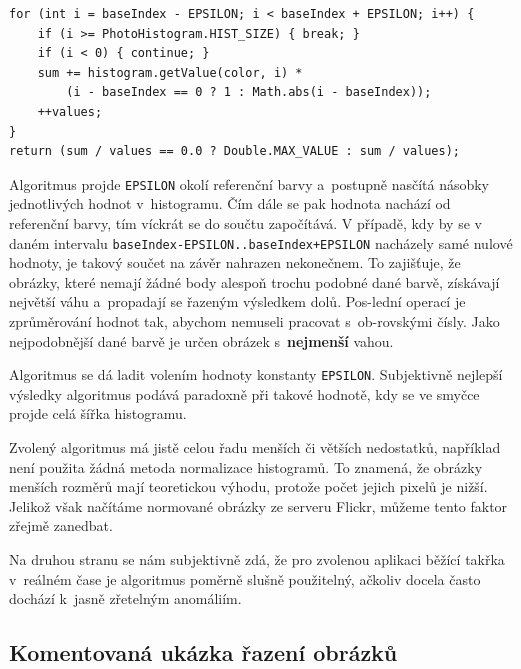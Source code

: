 \documentclass[12pt,oneside,a4paper]{article}
\newenvironment{listing}
{\begin{list}{}{\setlength{\leftmargin}{1em}}\item\scriptsize\bfseries}
{\end{list}}
\begin{document}
\begin{listing}
\begin{verbatim}
for (int i = baseIndex - EPSILON; i < baseIndex + EPSILON; i++) {
    if (i >= PhotoHistogram.HIST_SIZE) { break; }
    if (i < 0) { continue; }
    sum += histogram.getValue(color, i) *
        (i - baseIndex == 0 ? 1 : Math.abs(i - baseIndex));
    ++values;
}
return (sum / values == 0.0 ? Double.MAX_VALUE : sum / values);
\end{verbatim}
\end{listing}

Algoritmus projde \texttt{EPSILON} okolí referenční barvy a~postupně nasčítá násobky jednotlivých hodnot v~histogramu. Čím dále se pak hodnota nachází od referenční barvy, tím víckrát se do součtu započítává. V případě, kdy by se v daném intervalu \texttt{baseIndex-EPSILON..baseIndex+EPSILON} nacházely samé nulové hodnoty, je takový součet na závěr nahrazen nekonečnem. To zajišťuje, že obrázky, které nemají žádné body alespoň trochu podobné dané barvě, získávají největší váhu a~propadají se řazeným výsledkem dolů. Pos-lední operací je zprůměrování hodnot tak, abychom nemuseli pracovat s~ob-rovskými čísly. Jako nejpodobnější dané barvě je určen obrázek s~\textbf{nejmenší} vahou.

Algoritmus se dá ladit volením hodnoty konstanty \texttt{EPSILON}. Subjektivně nejlepší výsledky algoritmus podává paradoxně při takové hodnotě, kdy se ve smyčce projde celá šířka histogramu.

Zvolený algoritmus má jistě celou řadu menších či větších nedostatků, například není použita žádná metoda normalizace histogramů. To znamená, že obrázky menších rozměrů mají teoretickou výhodu, protože počet jejich pixelů je nižší. Jelikož však načítáme normované obrázky ze serveru Flickr, můžeme tento faktor zřejmě zanedbat.

Na druhou stranu se nám subjektivně zdá, že pro zvolenou aplikaci běžící takřka v~reálném čase je algoritmus poměrně slušně použitelný, ačkoliv docela často dochází k~jasně zřetelným anomáliím.

\subsection{Komentovaná ukázka řazení obrázků}
\end{document}
